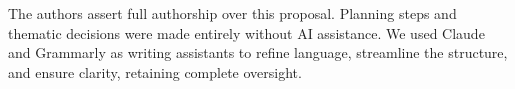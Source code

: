 \documentclass[manuscript,review]{acmart}
\begin{document}
\begin{acks}
The authors assert full authorship over this proposal. Planning steps and thematic decisions were made entirely without AI assistance. We used Claude and Grammarly as writing assistants to refine language, streamline the structure, and ensure clarity, retaining complete oversight.

\end{acks}





\newpage

\appendix
\end{document}
